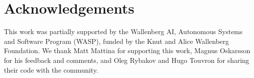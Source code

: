 \documentclass[a4paper]{article}
\begin{document}
\section{Acknowledgements}
This work was partially supported by the Wallenberg AI, Autonomous Systems and Software Program (WASP), funded by the Knut and Alice Wallenberg Foundation. We thank Matt Mattina for supporting this work, Magnus Oskarsson for his feedback and comments, and Oleg Rybakov and Hugo Touvron for sharing their code with the community.



\end{document}

